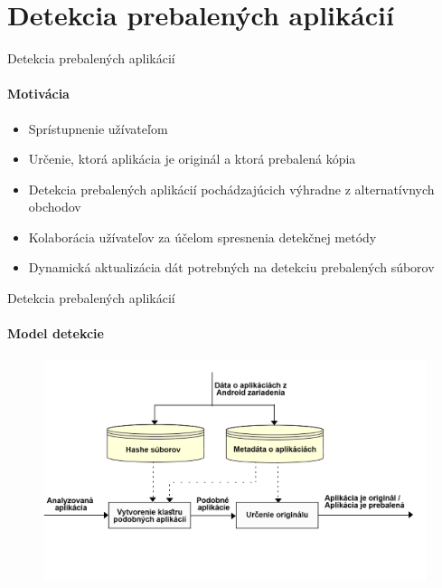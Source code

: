 \documentclass{beamer}
\begin{document}
 \section{Detekcia prebalených aplikácií}  
  \begin{frame}[label=lists]{Detekcia prebalených aplikácií}
 	 \framesubtitle{Motivácia}
		\begin{itemize}
			\item Sprístupnenie užívateľom
			\item Určenie, ktorá aplikácia je originál a ktorá prebalená kópia
			\item Detekcia prebalených aplikácií pochádzajúcich výhradne z alternatívnych obchodov
			\item Kolaborácia užívateľov za účelom spresnenia detekčnej metódy
			\item Dynamická aktualizácia dát potrebných na detekciu prebalených súborov
		\end{itemize}
  \end{frame}   
  
    \begin{frame}[label=lists]{Detekcia prebalených aplikácií}
 	 \framesubtitle{Model detekcie}
		\begin{figure}[htb]
	  	\begin{center}
    		\includegraphics[height=6.5cm]{images/detection-overview.png}
  		\end{center}
	\end{figure}
  \end{frame}   
  
\end{document}
